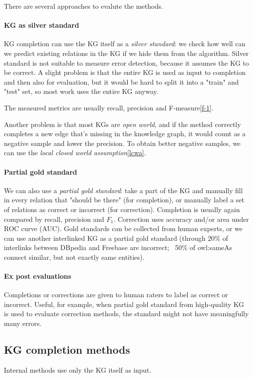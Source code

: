 There are several approaches to evalute the methods.
\paragraph{KG as silver standard}
KG completion can use the KG itself as a \textit{silver standard}: we check how
well can we predict existing relations in the KG if we hide them from the
algorithm. Silver standard is not suitable to measure error detection, because
it assumes the KG to be correct.
A slight problem is that the entire KG is used as input to completion and then
also for evaluation, but it would be hard to split it into a "train" and "test"
set, so most work uses the entire KG anyway.

The measured metrics are usually recall, precision and F-measure\ref{f-1}.

Another problem is that most KGs are \textit{open world}, and if the method
correctly completes a new edge that's missing in the knowledge graph, it would
count as a negative sample and lower the precision. To obtain better negative
samples, we can use the \textit{local closed world assumption}\ref{lcwa}.

\paragraph{Partial gold standard}
We can also use a \textit{partial gold standard}: take a part of the KG and
manually fill in every relation that "should be there" (for completion), or
manually label a set of relations as correct or incorrect (for correction).
Completion is usually again compared by recall, precision and $F_1$.
Correction uses accuracy and/or area under ROC curve (AUC).
Gold standards can be collected from human experts, or we can use another
interlinked KG as a partial gold standard (through 20\% of interlinks between
DBpedia and Freebase are incorrect; ~50\% of owl:sameAs connect similar, but not
exactly same entities).

\paragraph{Ex post evaluations}
Completions or corrections are given to human raters to label as correct or
incorrect. Useful, for example, when partial gold standard from high-quality KG
is used to evaluate correction methods, the standard might not have
meaningfully many errors.

\subsection{KG completion methods}
Internal methods use only the KG itself as input.

